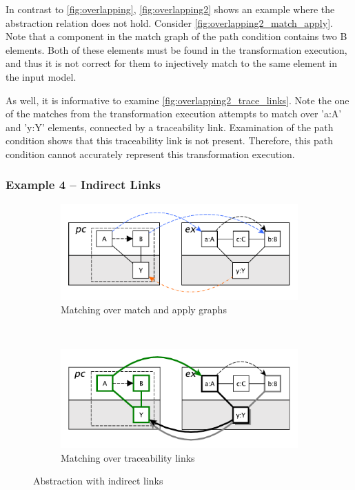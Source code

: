 In contrast to \cref{fig:overlapping}, \cref{fig:overlapping2} shows an example where the abstraction relation does not hold. Consider \cref{fig:overlapping2_match_apply}. Note that a component in the match graph of the path condition contains two B elements. Both of these elements must be found in the transformation execution, and thus it is not correct for them to injectively match to the same element in the input model.

As well, it is informative to examine \cref{fig:overlapping2_trace_links}. Note the one of the matches from the transformation execution attempts to match over 'a:A' and 'y:Y' elements, connected by a traceability link. Examination of the path condition shows that this traceability link is not present. Therefore, this path condition cannot accurately represent this transformation execution.


\subsubsection{Example 4 -- Indirect Links}

\begin{figure}[htb]
        \centering
        \begin{subfigure}[b]{0.40\textwidth}
                \centering
                \includegraphics[width=1\textwidth]{./figures/abstraction_relation/indirect.pdf}
               	\caption{Matching over match and apply graphs}
               	\label{fig:indirect_match_apply}
        \end{subfigure}%
        ~~\\
        \begin{subfigure}[b]{0.40\textwidth}
                \centering
                \includegraphics[width=1\textwidth]{./figures/abstraction_relation/indirect_trace_links.pdf}
                \caption{Matching over traceability links}
                \label{fig:indirect_trace_links}
        \end{subfigure}%
        \caption{Abstraction with indirect links}
        \label{fig:indirect}
\end{figure}

